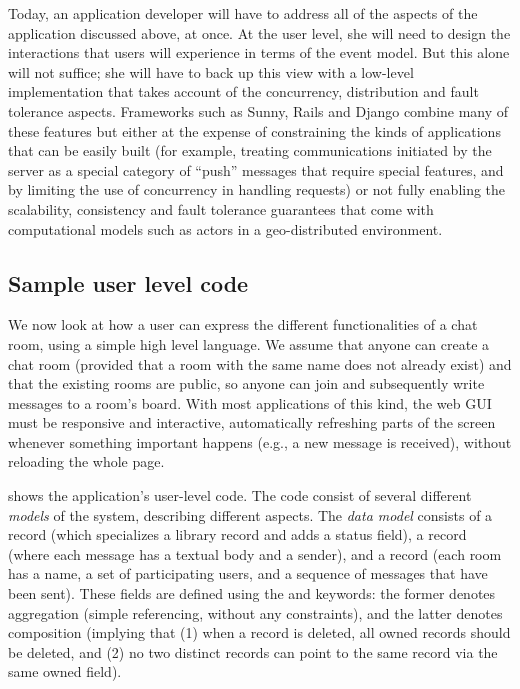 \documentclass[a4paper]{article}
\begin{document}
Today, an application developer will have to address all of the aspects of the application discussed above, at once. At the user level, she will need to design the interactions that users will experience in terms of the event model. But this alone will not suffice; she will have to back up this view with a low-level implementation that takes account of the
concurrency, distribution and fault tolerance aspects. Frameworks such as Sunny, Rails and Django combine many of these features but either at the expense of constraining the kinds of applications that can be easily built (for example, treating communications initiated by the server as a special category of “push” messages that require special features, and by limiting the use of concurrency in handling requests) or not fully enabling the scalability, consistency and fault tolerance guarantees that come with computational models such as actors in a geo-distributed environment.

\subsection{Sample user level code}
We now look at how a user can express the different functionalities of a chat room, using a simple high level language. We assume that anyone can create a chat room (provided that a room with the same name does not already exist) and that the existing rooms are public, so anyone can join and subsequently write messages to a room’s board. With most applications of this kind, the web GUI must be responsive and interactive, automatically refreshing parts of the screen whenever something important happens (e.g., a new message is received), without reloading the whole page. 



 shows the application's user-level code. The code
consist of several different \emph{models} of the system, describing
different aspects.  The \emph{data model} consists of a 
record (which specializes a library  record and adds a
status field), a  record (where each message has a textual
body and a sender), and a  record (each room has a name,
a set of participating users, and a sequence of messages that have
been sent).  These fields are defined using the  and
 keywords: the former denotes aggregation (simple
referencing, without any constraints), and the latter denotes
composition (implying that (1) when a record is deleted, all owned
records should be deleted, and (2) no two distinct records can point
to the same record via the same owned field).
\end{document}
